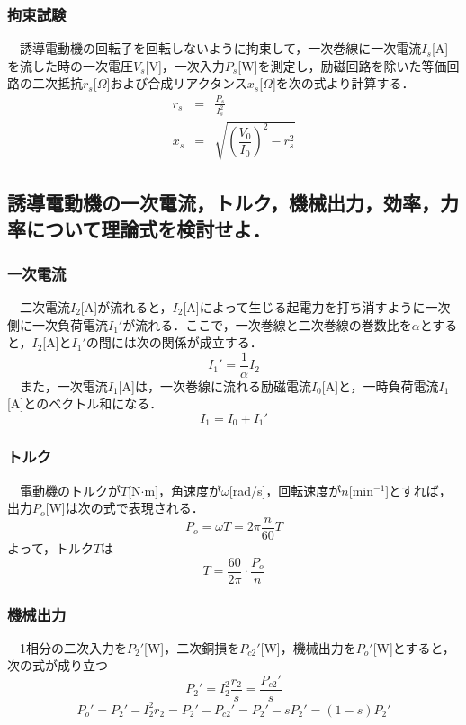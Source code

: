 \subsubsection{拘束試験}
　誘導電動機の回転子を回転しないように拘束して，一次巻線に一次電流$I_s$[A]を流した時の一次電圧$V_s$[V]，一次入力$P_s$[W]を測定し，励磁回路を除いた等価回路の二次抵抗$r_s$[$\Omega$]および合成リアクタンス$x_s$[$\Omega$]を次の式より計算する．
\begin{eqnarray}
    r_s &=& \frac{P_s}{I_s^2}\\
    x_s &=& \sqrt{\left(\dfrac{V_0}{I_0}\right)^2 - r_s^2}
\end{eqnarray}

\subsection{誘導電動機の一次電流，トルク，機械出力，効率，力率について理論式を検討せよ．}
\subsubsection{一次電流}
　二次電流$I_2$[A]が流れると，$I_2$[A]によって生じる起電力を打ち消すように一次側に一次負荷電流$I_1'$が流れる．ここで，一次巻線と二次巻線の巻数比を$\alpha$とすると，$I_2$[A]と$I_1'$の間には次の関係が成立する．
\begin{equation}
    I_1' = \frac{1}{\alpha} I_2
\end{equation}
　また，一次電流$I_1$[A]は，一次巻線に流れる励磁電流$I_0$[A]と，一時負荷電流$I_1$[A]とのベクトル和になる．
\begin{equation}
    I_1 = I_0 + I_1'
\end{equation}

\subsubsection{トルク}
　電動機のトルクが$T$[N$\cdot$m]，角速度が$\omega$[rad/s]，回転速度が$n$[min$^{-1}$]とすれば，出力$P_o$[W]は次の式で表現される．
\begin{equation}
    P_o = \omega T = 2 \pi \frac{n}{60} T
\end{equation}
よって，トルク$T$は
\begin{equation}
    T = \frac{60}{2\pi}\cdot\frac{P_o}{n}
\end{equation}

\subsubsection{機械出力}
　1相分の二次入力を$P_2'$[W]，二次銅損を$P_{c2}'$[W]，機械出力を$P_o'$[W]とすると，次の式が成り立つ
\begin{equation}
    P_2' = I_2^2\frac{r_2}{s} = \frac{P_{c2}'}{s}
\end{equation}
\begin{equation}
    P_o' = P_2'-I_2^2r_2 = P_2'-P_{c2}'=P_2'-sP_2' = (1-s)P_2'
\end{equation}

